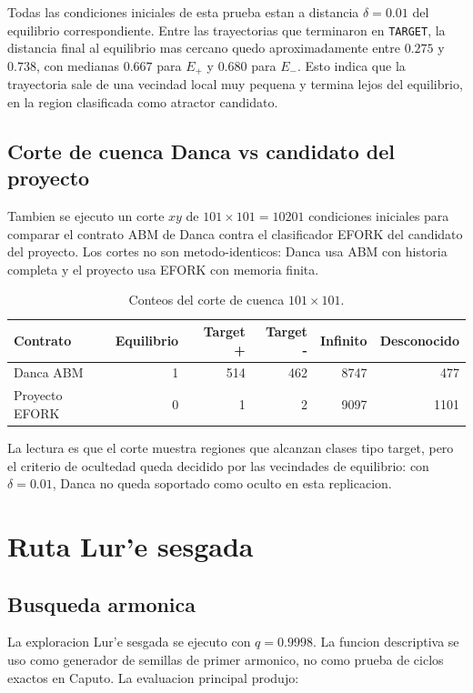 \documentclass[11pt]{article}
\newcommand{\target}{\texttt{TARGET}}
\newcommand{\qmain}{0.9998}
\newcommand{\Eplus}{E_+}
\newcommand{\Eminus}{E_-}
\begin{document}
Todas las condiciones iniciales de esta prueba estan a distancia
\(\delta=0.01\) del equilibrio correspondiente. Entre las trayectorias que
terminaron en \target{}, la distancia final al equilibrio mas cercano quedo
aproximadamente entre \(0.275\) y \(0.738\), con medianas \(0.667\) para
\(\Eplus\) y \(0.680\) para \(\Eminus\). Esto indica que la trayectoria sale de
una vecindad local muy pequena y termina lejos del equilibrio, en la region
clasificada como atractor candidato.

\subsection{Corte de cuenca Danca vs candidato del proyecto}

Tambien se ejecuto un corte \(xy\) de \(101\times101=10201\) condiciones
iniciales para comparar el contrato ABM de Danca contra el clasificador EFORK
del candidato del proyecto. Los cortes no son metodo-identicos: Danca usa ABM
con historia completa y el proyecto usa EFORK con memoria finita.

\begin{table}[h]
\centering
\caption{Conteos del corte de cuenca \(101\times101\).}
\small
\begin{tabular}{lrrrrr}
\toprule
Contrato & Equilibrio & Target + & Target - & Infinito & Desconocido \\
\midrule
Danca ABM & 1 & 514 & 462 & 8747 & 477 \\
Proyecto EFORK & 0 & 1 & 2 & 9097 & 1101 \\
\bottomrule
\end{tabular}
\end{table}

La lectura es que el corte muestra regiones que alcanzan clases tipo target,
pero el criterio de ocultedad queda decidido por las vecindades de equilibrio:
con \(\delta=0.01\), Danca no queda soportado como oculto en esta replicacion.

\section{Ruta Lur'e sesgada}

\subsection{Busqueda armonica}

La exploracion Lur'e sesgada se ejecuto con \(q=\qmain\). La funcion
descriptiva se uso como generador de semillas de primer armonico, no como
prueba de ciclos exactos en Caputo. La evaluacion principal produjo:
\end{document}
